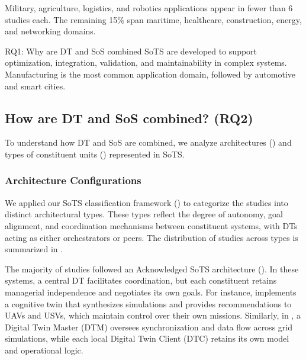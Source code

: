 Military, agriculture, logistics, and robotics applications appear in fewer than 6 studies each. The remaining 15\% span maritime, healthcare, construction, energy, and networking domains.



\begin{conclusionframe}{RQ1: Why are DT and SoS combined}
SoTS are developed to support optimization, integration, validation, and maintainability in complex systems. Manufacturing is the most common application domain, followed by automotive and smart cities.
\end{conclusionframe}


\subsection{How are DT and SoS combined? (RQ2)}\label{results-rq2}

To understand how DT and SoS are combined, we analyze architectures () and types of constituent units () represented in SoTS.



\subsubsection{Architecture Configurations}\label{sec:architecture}



We applied our SoTS classification framework () to categorize the studies into distinct architectural types. These types reflect the degree of autonomy, goal alignment, and coordination mechanisms between constituent systems, with DTs acting as either orchestrators or peers. The distribution of studies across types is summarized in .

The majority of studies followed an Acknowledged SoTS architecture (). In these systems, a central DT facilitates coordination, but each constituent retains managerial independence and negotiates its own goals. For instance, \textcite{li2022cognitive} implements a cognitive twin that synthesizes simulations and provides recommendations to UAVs and USVs, which maintain control over their own missions. Similarly, in \textcite{monsalve2021novel}, a Digital Twin Master (DTM) oversees synchronization and data flow across grid simulations, while each local Digital Twin Client (DTC) retains its own model and operational logic.

